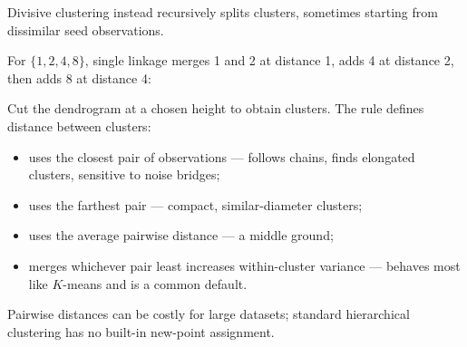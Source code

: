 Divisive clustering instead recursively splits clusters, sometimes starting from dissimilar seed observations.

\begin{workedexample}
For $\{1,2,4,8\}$, single linkage merges 1 and 2 at distance 1, adds 4 at distance 2, then adds 8 at distance 4:
\end{workedexample}

\begin{mlfigure}
\end{mlfigure}

Cut the dendrogram at a chosen height to obtain clusters. The  rule defines distance between clusters:

\begin{itemize}
  \item {} uses the closest pair of observations --- follows chains, finds elongated clusters, sensitive to noise bridges;
  \item {} uses the farthest pair --- compact, similar-diameter clusters;
  \item {} uses the average pairwise distance --- a middle ground;
  \item {} merges whichever pair least increases within-cluster variance --- behaves most like $K$-means and is a common default.
\end{itemize}

Pairwise distances can be costly for large datasets; standard hierarchical clustering has no built-in new-point assignment.

